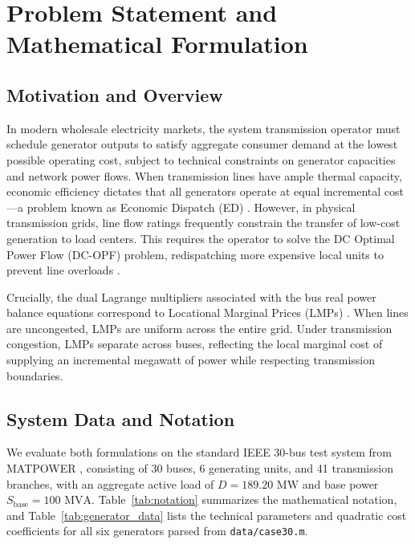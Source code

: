 \section{Problem Statement and Mathematical Formulation}
\label{sec:formulation}

\subsection{Motivation and Overview}
In modern wholesale electricity markets, the system transmission operator must schedule generator outputs to satisfy aggregate consumer demand at the lowest possible operating cost, subject to technical constraints on generator capacities and network power flows. When transmission lines have ample thermal capacity, economic efficiency dictates that all generators operate at equal incremental cost---a problem known as Economic Dispatch (ED) \cite{wood2014}. However, in physical transmission grids, line flow ratings frequently constrain the transfer of low-cost generation to load centers. This requires the operator to solve the DC Optimal Power Flow (DC-OPF) problem, redispatching more expensive local units to prevent line overloads \cite{wood2014, zimmerman2011}.

Crucially, the dual Lagrange multipliers associated with the bus real power balance equations correspond to Locational Marginal Prices (LMPs) \cite{boyd2004}. When lines are uncongested, LMPs are uniform across the entire grid. Under transmission congestion, LMPs separate across buses, reflecting the local marginal cost of supplying an incremental megawatt of power while respecting transmission boundaries.

\subsection{System Data and Notation}
We evaluate both formulations on the standard IEEE 30-bus test system from MATPOWER \cite{zimmerman2011}, consisting of 30 buses, 6 generating units, and 41 transmission branches, with an aggregate active load of $D = 189.20\text{ MW}$ and base power $S_{\text{base}} = 100\text{ MVA}$. Table~\ref{tab:notation} summarizes the mathematical notation, and Table~\ref{tab:generator_data} lists the technical parameters and quadratic cost coefficients for all six generators parsed from \texttt{data/case30.m}.

